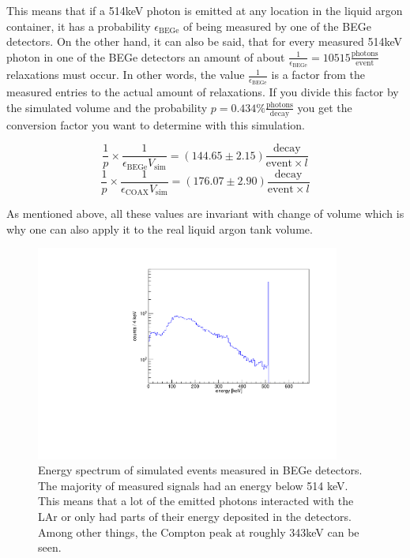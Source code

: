 \documentclass[encoding=utf8,british]{tumphthesis}
\begin{document}
This means that if a 514keV photon is emitted at any location in the liquid argon container, it has a probability \(\epsilon_{\mathrm{BEGe}}\) of being measured by one of the BEGe detectors.
On the other hand, it can also be said, that for every measured 514keV photon in one of the BEGe detectors an amount of about $\frac{1}{\epsilon_{\mathrm{BEGe}}} = 10515 \frac{\mathrm{photons}}{\mathrm{event}}$  relaxations must occur.
In other words, the value $\frac{1}{\epsilon_{\mathrm{BEGe}}}$ is a factor from the measured entries to the actual amount of  relaxations.
If you divide this factor by the simulated volume and the probability $p=0.434\% \frac{\mathrm{photons}}{\mathrm{decay}}$ you get the conversion factor you want to determine with this simulation.

\begin{equation*}
\frac{1}{p}\times\frac{1}{\epsilon_{\mathrm{BEGe}} V_{\mathrm{sim}}} = (144.65\pm2.15) \frac{\mathrm{decay}}{\mathrm{event} \times l}
\end{equation*}
\begin{equation*}
\frac{1}{p}\times\frac{1}{\epsilon_{\mathrm{COAX}} V_{\mathrm{sim}}} = (176.07\pm2.90) \frac{\mathrm{decay}}{\mathrm{event} \times l}
\end{equation*}

As mentioned above, all these values are invariant with change of volume which is why one can also apply it to the real liquid argon tank volume. 
\\

\begin{figure}[t!]
	\centering
	\ifmakefigures%
	\includegraphics[width=100mm]{./Bilder/MC-514-Phasenraum.pdf}
	\fi%
	\caption{
    Energy spectrum of simulated events measured in BEGe detectors.
	The majority of measured signals had an energy below 514 keV.
	This means that a lot of the emitted photons interacted with the LAr or only had parts of their energy deposited in the detectors.
	Among other things, the Compton peak at roughly 343keV can be seen.  
	}
	\label{fig:PhasenraumMC514}
\end{figure}
\end{document}
